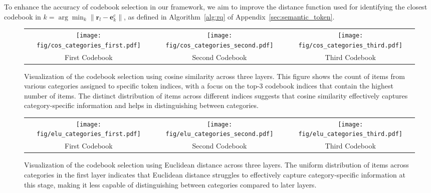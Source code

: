 To enhance the accuracy of codebook selection in our framework, we aim to improve the distance function used for identifying the closest codebook in $k=\arg \min_k\left\|\boldsymbol{r}_{l}-\boldsymbol{e}^c_{k}\right\|$, as defined in Algorithm~\ref{alg:rq} of Appendix~\ref{sec:semantic_token}.

\begin{figure*}[t!]
		\centering
		\begin{tabular}{ccc}
		    	\texttt{[image: fig/cos\_categories\_first.pdf]} &  \texttt{[image: fig/cos\_categories\_second.pdf]} &
       \texttt{[image: fig/cos\_categories\_third.pdf]} 
		     \\ First Codebook & Second Codebook & Third Codebook
		\end{tabular}
    \caption{Visualization of the codebook selection using cosine similarity across three layers. This figure shows the count of items from various categories assigned to specific token indices, with a focus on the top-3 codebook indices that contain the highest number of items. The distinct distribution of items across different indices suggests that cosine similarity effectively captures category-specific information and helps in distinguishing between categories.}\label{fig:cosine}
\end{figure*} 

\begin{figure*}[!htb]
		\centering
		\begin{tabular}{ccc}
		    	\texttt{[image: fig/elu\_categories\_first.pdf]} &  \texttt{[image: fig/elu\_categories\_second.pdf]} &
       \texttt{[image: fig/elu\_categories\_third.pdf]} 
		     \\ First Codebook & Second Codebook & Third Codebook
		\end{tabular}
 \caption{Visualization of the codebook selection using Euclidean distance across three layers. The uniform distribution of items across categories in the first layer indicates that Euclidean distance struggles to effectively capture category-specific information at this stage, making it less capable of distinguishing between categories compared to later layers.}
\label{fig:elu}
\end{figure*} 

